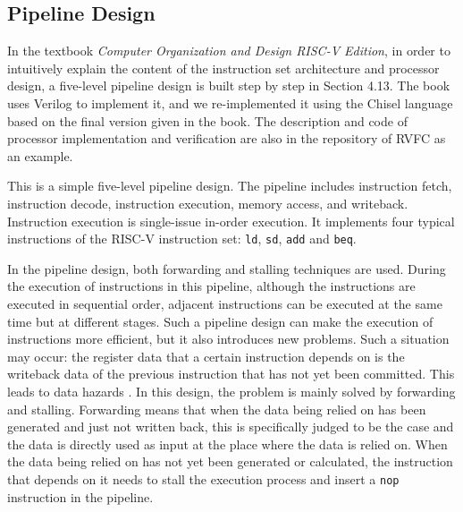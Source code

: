 \documentclass[conference]{IEEEtran}
\theoremstyle{definition}
\begin{document}
\subsection{Pipeline Design}
In the textbook \textit{Computer Organization and Design RISC-V Edition}, in order to intuitively explain the content of the instruction set architecture and processor design, a five-level pipeline design is built step by step in Section 4.13.
The book uses Verilog to implement it, and we re-implemented it using the Chisel language based on the final version given in the book.
The description and code of processor implementation and verification are also in the repository of RVFC \cite{riscvFvChisel} as an example.

This is a simple five-level pipeline design. 
The pipeline includes instruction fetch, instruction decode, instruction execution, memory access, and writeback.
Instruction execution is single-issue in-order execution.
It implements four typical instructions of the RISC-V instruction set: \verb|ld|, \verb|sd|, \verb|add| and \verb|beq|.

In the pipeline design, both forwarding and stalling techniques are used.
During the execution of instructions in this pipeline, although the instructions are executed in sequential order, adjacent instructions can be executed at the same time but at different stages.
Such a pipeline design can make the execution of instructions more efficient, but it also introduces new problems.
Such a situation may occur: the register data that a certain instruction depends on is the writeback data of the previous instruction that has not yet been committed.
This leads to data hazards \cite{patterson2017computer}.
In this design, the problem is mainly solved by forwarding and stalling.
Forwarding means that when the data being relied on has been generated and just not written back, this is specifically judged to be the case and the data is directly used as input at the place where the data is relied on.
When the data being relied on has not yet been generated or calculated, the instruction that depends on it needs to stall the execution process and insert a \verb|nop| instruction in the pipeline.
\end{document}
